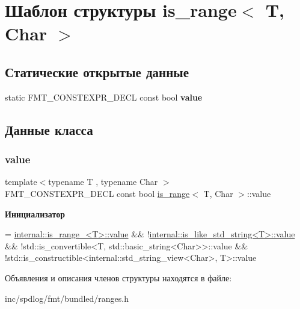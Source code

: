 \hypertarget{structis__range}{}\section{Шаблон структуры is\+\_\+range$<$ T, Char $>$}
\label{structis__range}
\subsection*{Статические открытые данные}
\begin{DoxyCompactItemize}
\item 
static F\+M\+T\+\_\+\+C\+O\+N\+S\+T\+E\+X\+P\+R\+\_\+\+D\+E\+CL const bool {\bfseries value}
\end{DoxyCompactItemize}


\subsection{Данные класса}
\mbox{\label{structis__range_a7fb8ce1b27032b372bb59ad66e8ae11a}} 
\subsubsection{\texorpdfstring{value}{value}}
{\footnotesize\ttfamily template$<$typename T , typename Char $>$ \\
F\+M\+T\+\_\+\+C\+O\+N\+S\+T\+E\+X\+P\+R\+\_\+\+D\+E\+CL const bool \hyperlink{structis__range}{is\+\_\+range}$<$ T, Char $>$\+::value\hspace{0.3cm}{\ttfamily [static]}}

{\bfseries Инициализатор}
\begin{DoxyCode}
=
      \hyperlink{structinternal_1_1is__range__}{internal::is\_range\_<T>::value} &&
      !\hyperlink{classinternal_1_1is__like__std__string}{internal::is\_like\_std\_string<T>::value} &&
      !std::is\_convertible<T, std::basic\_string<Char>>::value &&
      !std::is\_constructible<internal::std\_string\_view<Char>, T>::value
\end{DoxyCode}


Объявления и описания членов структуры находятся в файле\+:\begin{DoxyCompactItemize}
\item 
inc/spdlog/fmt/bundled/ranges.\+h\end{DoxyCompactItemize}
